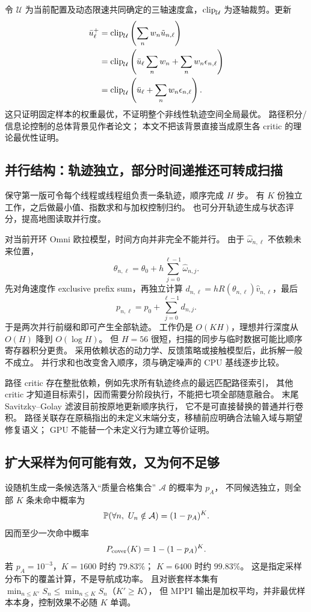 令 $\mathcal U$ 为当前配置及动态限速共同确定的三轴速度盒，$\operatorname{clip}_{\mathcal U}$ 为逐轴裁剪。更新
\begin{align}
\bar u_\ell^+&=\operatorname{clip}_{\mathcal U}\left(\sum_nw_n\tilde u_{n,\ell}\right)\\
&=\operatorname{clip}_{\mathcal U}\left(\bar u_\ell\sum_nw_n+\sum_nw_n\epsilon_{n,\ell}\right)\\
&=\operatorname{clip}_{\mathcal U}\left(\bar u_\ell+\sum_nw_n\epsilon_{n,\ell}\right).
\end{align}
这只证明固定样本的权重最优，不证明整个非线性轨迹空间全局最优。
路径积分/信息论控制的总体背景见作者论文\cite{itmppi}；
本文不把该背景直接当成原生各 critic 的理论最优性证明。

\subsection{并行结构：轨迹独立，部分时间递推还可转成扫描}
保守第一版可令每个线程或线程组负责一条轨迹，顺序完成 $H$ 步。
有 $K$ 份独立工作，之后做最小值、指数求和与加权控制归约。
也可分开轨迹生成与状态评分，提高地图读取并行度。

对当前开环 Omni 欧拉模型，时间方向并非完全不能并行。
由于 $\hat\omega_{n,\ell}$ 不依赖未来位置，
\begin{equation}
\theta_{n,\ell}=\theta_0+h\sum_{j=0}^{\ell-1}\hat\omega_{n,j}.
\end{equation}
先对角速度作 exclusive prefix sum，再独立计算
$d_{n,\ell}=hR(\theta_{n,\ell})\hat v_{n,\ell}$，最后
\begin{equation}
p_{n,\ell}=p_0+\sum_{j=0}^{\ell-1}d_{n,j}.
\end{equation}
于是两次并行前缀和即可产生全部轨迹。
工作仍是 $O(KH)$，理想并行深度从 $O(H)$ 降到 $O(\log H)$。
但 $H=56$ 很短，扫描的同步与临时数据可能比顺序寄存器积分更贵。
采用依赖状态的动力学、反馈策略或接触模型后，此拆解一般不成立。
并行求和也改变舍入顺序，须与确定噪声的 CPU 基线逐步比较。

路径 critic 存在整批依赖，例如先求所有轨迹终点的最远匹配路径索引，
其他 critic 才知道目标索引，因而需要分阶段执行，不能把七项全部随意融合。
末尾 Savitzky--Golay 滤波目前按原地更新顺序执行，
它不是可直接替换的普通并行卷积。
路径关联存在原稿指出的未定义末端分支，移植前应明确合法输入域与期望修复语义；
GPU 不能替一个未定义行为建立等价证明。

\subsection{扩大采样为何可能有效，又为何不足够}
设随机生成一条候选落入“质量合格集合” $\mathcal A$ 的概率为 $p_A$，
不同候选独立，则全部 $K$ 条未命中概率为
\[
\Prob(\forall n,\ U_n\notin\mathcal A)=(1-p_A)^K.
\]
因而至少一次命中概率
\begin{equation}
P_{\rm cover}(K)=1-(1-p_A)^K.
\label{eq:coverage}
\end{equation}
若 $p_A=10^{-3}$，$K=1600$ 时约 $79.83\%$；
$K=6400$ 时约 $99.83\%$。
这是指定采样分布下的覆盖计算，不是导航成功率。
且对嵌套样本集有
$\min_{n\le K'}S_n\le\min_{n\le K}S_n$（$K'\ge K$），
但 MPPI 输出是加权平均，并非最优样本本身，控制效果不必随 $K$ 单调。

